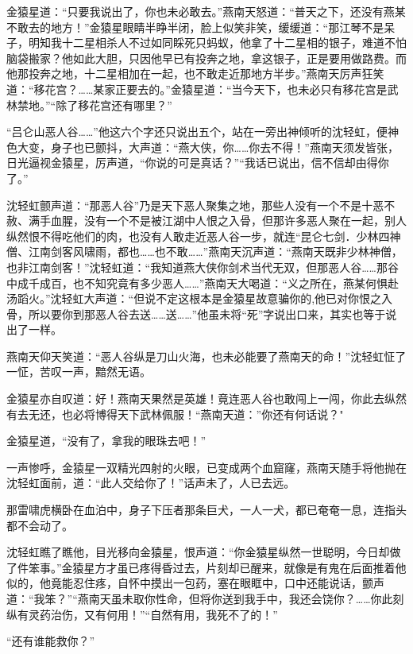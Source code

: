 \documentclass[12pt,oneside]{book}
\begin{document}
金猿星道：``只要我说出了，你也未必敢去。''燕南天怒道：``普天之下，还没有燕某不敢去的地方！''金猿星眼睛半睁半闭，脸上似笑非笑，缓缓道：``那江琴不是呆子，明知我十二星相杀人不过如同睬死只蚂蚁，他拿了十二星相的银子，难道不怕脑袋搬家？他如此大胆，只因他早已有投奔之地，拿这银子，正是要用做路费。而他那投奔之地，十二星相加在一起，也不敢走近那地方半步。''燕南天厉声狂笑道：``移花宫？\ldots\ldots 某家正要去的。''金猿星道：``当今天下，也未必只有移花宫是武林禁地。''``除了移花宫还有哪里？''

``吕仑山恶人谷\ldots\ldots{}''他这六个字还只说出五个，站在一旁出神倾听的沈轻虹，便神色大变，身子也已颤抖，大声道：``燕大侠，你\ldots\ldots 你去不得！''燕南天须发皆张，日光逼视金猿星，厉声道，``你说的可是真话？''``我话已说出，信不信却由得你了。''

沈轻虹颤声道：``那恶人谷''乃是天下恶人聚集之地，那些人没有一个不是十恶不赦、满手血腥，没有一个不是被江湖中人恨之入骨，但那许多恶人聚在一起，别人纵然恨不得吃他们的肉，也没有人敢走近恶人谷一步，就连``昆仑七剑．少林四神僧、江南剑客风啸雨，都也\ldots\ldots 也不敢\ldots\ldots{}''燕南天沉声道：``燕南天既非少林神僧，也非江南剑客！''沈轻虹道：``我知道燕大侠你剑术当代无双，但那恶人谷\ldots\ldots 那谷中成千成百，也不知究竟有多少恶人\ldots\ldots{}''燕南天大喝道：``义之所在，燕某何惧赴汤蹈火。''沈轻虹大声道：``但说不定这根本是金猿星故意骗你的,他已对你恨之入骨，所以要你到那恶人谷去送\ldots\ldots 送\ldots\ldots{}''他虽未将``死''字说出口来，其实也等于说出了一样。

燕南天仰天笑道：``恶人谷纵是刀山火海，也未必能要了燕南天的命！''沈轻虹怔了一怔，苦叹一声，黯然无语。

金猿星亦自叹道：好！燕南天果然是英雄！竟连恶人谷也敢闯上一闯，你此去纵然有去无还，也必将博得天下武林佩服！``燕南天道：''你还有何话说？"

金猿星道，``没有了，拿我的眼珠去吧！''

一声惨呼，金猿星一双精光四射的火眼，已变成两个血窟窿，燕南天随手将他抛在沈轻虹面前，道：``此人交给你了！''话声未了，人已去远。

那雷啸虎横卧在血泊中，身子下压者那条巨犬，一人一犬，都已奄奄一息，连指头都不会动了。

沈轻虹瞧了瞧他，目光移向金猿星，恨声道：``你金猿星纵然一世聪明，今日却做了件笨事。''金猿星方才虽已疼得昏过去，片刻却已醒来，就像是有鬼在后面推着他似的，他竟能忍住疼，自怀中摸出一包药，塞在眼眶中，口中还能说话，颤声道：``我笨？''``燕南天虽未取你性命，但将你送到我手中，我还会饶你？\ldots\ldots 你此刻纵有灵药治伤，又有何用！''``自然有用，我死不了的！''

``还有谁能救你？''
\end{document}
